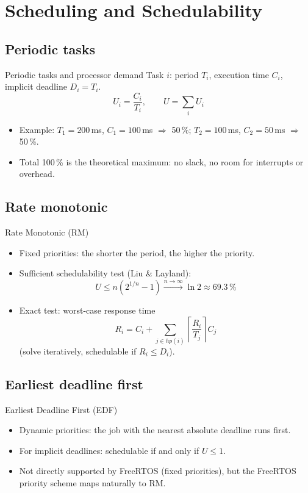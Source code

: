 \section{Scheduling and Schedulability}
\label{sec:schedulability}

\subsection{Periodic tasks}
\begin{frame}{Periodic tasks and processor demand}
  Task $i$: period $T_i$, execution time $C_i$, implicit deadline $D_i = T_i$.
  \[ U_i = \frac{C_i}{T_i}, \qquad U = \sum_i U_i \]
  \begin{itemize}
    \item Example: $T_1 = 200$\,ms, $C_1 = 100$\,ms $\Rightarrow$ 50\,\%; $T_2 = 100$\,ms, $C_2 = 50$\,ms $\Rightarrow$ 50\,\%.
    \item Total 100\,\% is the theoretical maximum: no slack, no room for interrupts or overhead.
  \end{itemize}
\end{frame}

\subsection{Rate monotonic}
\begin{frame}{Rate Monotonic (RM)}
  \begin{itemize}
    \item Fixed priorities: the shorter the period, the higher the priority.
    \item Sufficient schedulability test (Liu \& Layland):
    \[ U \le n\left(2^{1/n} - 1\right) \xrightarrow{n\to\infty} \ln 2 \approx 69.3\,\% \]
    \item Exact test: worst-case response time
    \[ R_i = C_i + \sum_{j \in hp(i)} \left\lceil \frac{R_i}{T_j} \right\rceil C_j \]
    (solve iteratively, schedulable if $R_i \le D_i$).
  \end{itemize}
\end{frame}

\subsection{Earliest deadline first}
\begin{frame}{Earliest Deadline First (EDF)}
  \begin{itemize}
    \item Dynamic priorities: the job with the nearest absolute deadline runs first.
    \item For implicit deadlines: schedulable if and only if $U \le 1$.
    \item Not directly supported by FreeRTOS (fixed priorities), but the FreeRTOS priority scheme maps naturally to RM.
  \end{itemize}
\end{frame}

